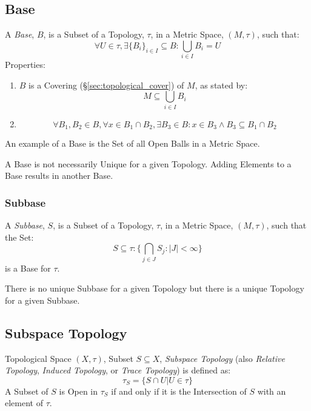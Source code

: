 \subsection{Base}\label{sec:topological_base}

A \emph{Base}, $B$, is a Subset of a Topology, $\tau$, in a Metric
Space, $(M,\tau)$, such that:
\[
  \forall U \in \tau, \exists \{B_i\}_{i \in I} \subseteq B :
  \bigcup_{i \in I}B_i = U
\]
Properties:
\begin{enumerate}
  \item $B$ is a Covering (\S\ref{sec:topological_cover}) of $M$, as
    stated by:
\[
  M \subseteq \bigcup_{i \in I} B_i
\]

  \item
\[
  \forall B_1, B_2 \in B, \forall x \in B_1 \cap B_2,
  \exists B_3 \in B : x \in B_3 \wedge B_3 \subseteq B_1 \cap B_2
\]

\end{enumerate}
An example of a Base is the Set of all Open Balls in a Metric Space.

A Base is not necessarily Unique for a given Topology. Adding Elements
to a Base results in another Base.



\subsubsection{Subbase}\label{sec:subbase}

A \emph{Subbase}, $S$, is a Subset of a Topology, $\tau$, in a Metric
Space, $(M,\tau)$, such that the Set:
\[
  S \subseteq \tau : \{ \bigcap_{j \in J} S_j : |J| < \infty \}
\]
is a Base for $\tau$.

There is no unique Subbase for a given Topology but there is a unique
Topology for a given Subbase.



\subsection{Subspace Topology}\label{sec:subspace_topology}

Topological Space $(X,\tau)$, Subset $S \subseteq X$, \emph{Subspace
  Topology} (also \emph{Relative Topology}, \emph{Induced Topology},
or \emph{Trace Topology}) is defined as:
\[
  \tau_S = \{ S \cap U | U \in \tau \}
\]
A Subset of $S$ is Open in $\tau_S$ if and only if it is the
Intersection of $S$ with an element of $\tau$.

